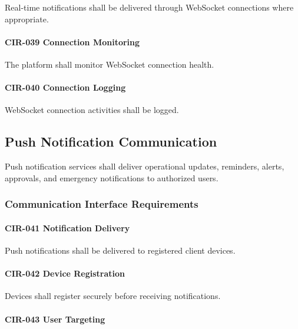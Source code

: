 Real-time notifications shall be delivered through WebSocket
connections where appropriate.

\paragraph{CIR-039 Connection Monitoring}

The platform shall monitor WebSocket connection health.

\paragraph{CIR-040 Connection Logging}

WebSocket connection activities shall be logged.


\subsection{Push Notification Communication}

Push notification services shall deliver operational updates, reminders,
alerts, approvals, and emergency notifications to authorized users.


\subsubsection*{Communication Interface Requirements}

\paragraph{CIR-041 Notification Delivery}

Push notifications shall be delivered to registered client devices.

\paragraph{CIR-042 Device Registration}

Devices shall register securely before receiving notifications.

\paragraph{CIR-043 User Targeting}

